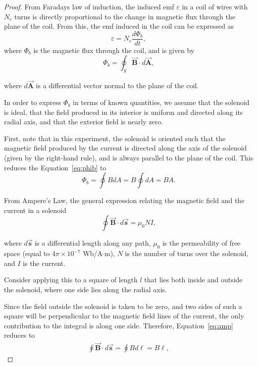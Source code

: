 \documentclass[twocolumn,english]{IEEEtran}
\newcommand{\vb}[1]{\mathbf{#1}}		%
\theoremstyle{plain}
\theoremstyle{plain}
\begin{document}
\begin{proof}
From Faradays law of induction, the induced emf $\varepsilon$ in a coil of wires with $N_c$ turns is directly proportional to the change in magnetic flux through the plane of the coil. From this, the emf induced in the coil can be expressed as
\begin{equation}\label{eq:orig}
	\varepsilon = N_c\frac{d \Phi_b}{dt},
\end{equation}
where $\Phi_b$ is the magnetic flux through the coil, and is given by
\begin{equation}\label{eq:phib}
		\Phi_b = \oint_S \vec{\vb{B}} \cdot d\vec{\vb{A}},
\end{equation}

where $d\vec{\vb{A}}$ is a differential vector normal to the plane of the coil.

In order to express $\Phi_b$ in terms of known quantities, we assume that the solenoid is ideal, that the field produced in its interior is uniform and directed along its radial axis, and that the exterior field is nearly zero.

First, note that in this experiment, the solenoid is oriented such that the magnetic field produced by the current is directed along the axis of the solenoid (given by the right-hand rule), and is always parallel to the plane of the coil. This reduces the Equation~\ref{eq:phib} to
\begin{equation}\label{eq:back1}
	\Phi_b = \oint B dA = B \oint dA = BA.
\end{equation}

From Ampere's Law, the general expression relating the magnetic field and the current in a solenoid
\begin{equation}\label{eq:amp}
	\oint \vec{\vb{B}}\cdot d\vec{\vb{s}} = \mu_0 N I,
\end{equation}

where $d\vec{\vb{s}}$ is a differential length along any path, $\mu_0$ is the permeability of free space (equal to $4\pi\times 10^{-7}$ Wb/A$\cdot$m), $N$ is the number of turns over the solenoid, and $I$ is the current.

Consider applying this to a square of length $l$ that lies both inside and outside the solenoid, where one side lies along the radial axis.

Since the field outside the solenoid is taken to be zero, and two sides of such a square will be perpendicular to the magnetic field lines of the current, the only contribution to the integral is along one side. Therefore, Equation~\ref{eq:amp} reduces to
\begin{align*}
	\oint \vec{\vb{B}}\cdot d\vec{\vb{s}} = \oint B d\ell = B\ell,
\end{align*}


\end{proof}
\end{document}
